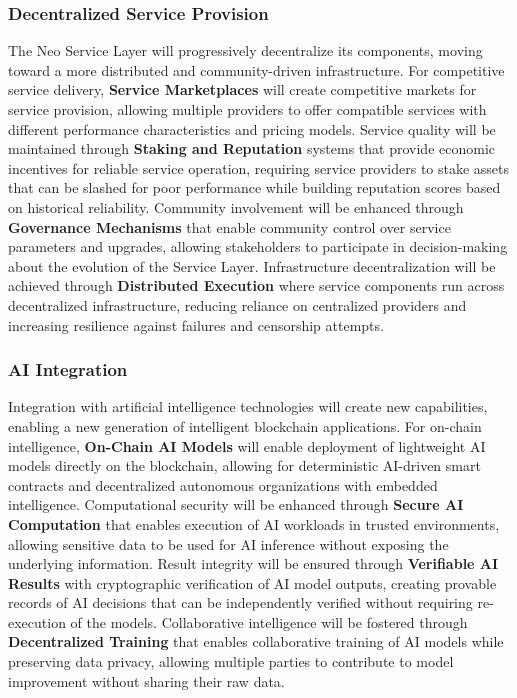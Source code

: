 \documentclass[11pt]{article}
\begin{document}
\subsubsection{Decentralized Service Provision}
\label{subsubsec:decentralized-service}

The Neo Service Layer will progressively decentralize its components, moving toward a more distributed and community-driven infrastructure. For competitive service delivery, \textbf{Service Marketplaces} will create competitive markets for service provision, allowing multiple providers to offer compatible services with different performance characteristics and pricing models. Service quality will be maintained through \textbf{Staking and Reputation} systems that provide economic incentives for reliable service operation, requiring service providers to stake assets that can be slashed for poor performance while building reputation scores based on historical reliability. Community involvement will be enhanced through \textbf{Governance Mechanisms} that enable community control over service parameters and upgrades, allowing stakeholders to participate in decision-making about the evolution of the Service Layer. Infrastructure decentralization will be achieved through \textbf{Distributed Execution} where service components run across decentralized infrastructure, reducing reliance on centralized providers and increasing resilience against failures and censorship attempts.

\subsubsection{AI Integration}
\label{subsubsec:ai-integration}

Integration with artificial intelligence technologies will create new capabilities, enabling a new generation of intelligent blockchain applications. For on-chain intelligence, \textbf{On-Chain AI Models} will enable deployment of lightweight AI models directly on the blockchain, allowing for deterministic AI-driven smart contracts and decentralized autonomous organizations with embedded intelligence. Computational security will be enhanced through \textbf{Secure AI Computation} that enables execution of AI workloads in trusted environments, allowing sensitive data to be used for AI inference without exposing the underlying information. Result integrity will be ensured through \textbf{Verifiable AI Results} with cryptographic verification of AI model outputs, creating provable records of AI decisions that can be independently verified without requiring re-execution of the models. Collaborative intelligence will be fostered through \textbf{Decentralized Training} that enables collaborative training of AI models while preserving data privacy, allowing multiple parties to contribute to model improvement without sharing their raw data.
\end{document}
